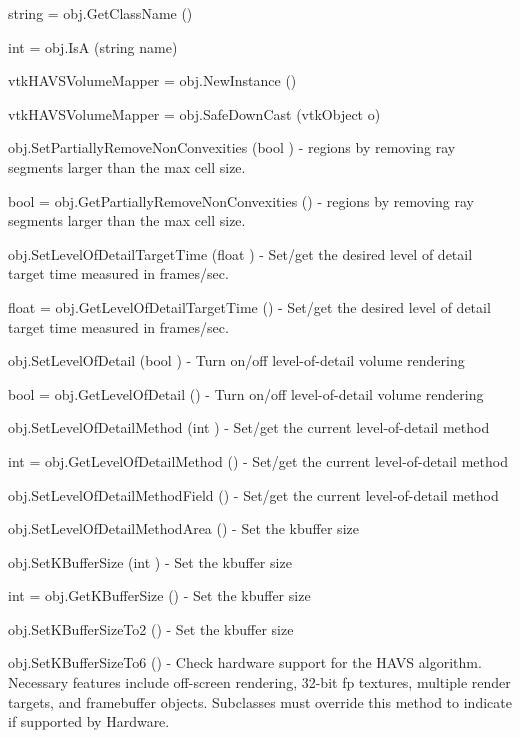 \begin{DoxyItemize}
\item {\ttfamily string = obj.\-Get\-Class\-Name ()}  
\item {\ttfamily int = obj.\-Is\-A (string name)}  
\item {\ttfamily vtk\-H\-A\-V\-S\-Volume\-Mapper = obj.\-New\-Instance ()}  
\item {\ttfamily vtk\-H\-A\-V\-S\-Volume\-Mapper = obj.\-Safe\-Down\-Cast (vtk\-Object o)}  
\item {\ttfamily obj.\-Set\-Partially\-Remove\-Non\-Convexities (bool )} -\/ regions by removing ray segments larger than the max cell size.  
\item {\ttfamily bool = obj.\-Get\-Partially\-Remove\-Non\-Convexities ()} -\/ regions by removing ray segments larger than the max cell size.  
\item {\ttfamily obj.\-Set\-Level\-Of\-Detail\-Target\-Time (float )} -\/ Set/get the desired level of detail target time measured in frames/sec.  
\item {\ttfamily float = obj.\-Get\-Level\-Of\-Detail\-Target\-Time ()} -\/ Set/get the desired level of detail target time measured in frames/sec.  
\item {\ttfamily obj.\-Set\-Level\-Of\-Detail (bool )} -\/ Turn on/off level-\/of-\/detail volume rendering  
\item {\ttfamily bool = obj.\-Get\-Level\-Of\-Detail ()} -\/ Turn on/off level-\/of-\/detail volume rendering  
\item {\ttfamily obj.\-Set\-Level\-Of\-Detail\-Method (int )} -\/ Set/get the current level-\/of-\/detail method  
\item {\ttfamily int = obj.\-Get\-Level\-Of\-Detail\-Method ()} -\/ Set/get the current level-\/of-\/detail method  
\item {\ttfamily obj.\-Set\-Level\-Of\-Detail\-Method\-Field ()} -\/ Set/get the current level-\/of-\/detail method  
\item {\ttfamily obj.\-Set\-Level\-Of\-Detail\-Method\-Area ()} -\/ Set the kbuffer size  
\item {\ttfamily obj.\-Set\-K\-Buffer\-Size (int )} -\/ Set the kbuffer size  
\item {\ttfamily int = obj.\-Get\-K\-Buffer\-Size ()} -\/ Set the kbuffer size  
\item {\ttfamily obj.\-Set\-K\-Buffer\-Size\-To2 ()} -\/ Set the kbuffer size  
\item {\ttfamily obj.\-Set\-K\-Buffer\-Size\-To6 ()} -\/ Check hardware support for the H\-A\-V\-S algorithm. Necessary features include off-\/screen rendering, 32-\/bit fp textures, multiple render targets, and framebuffer objects. Subclasses must override this method to indicate if supported by Hardware.  

\end{DoxyItemize}

